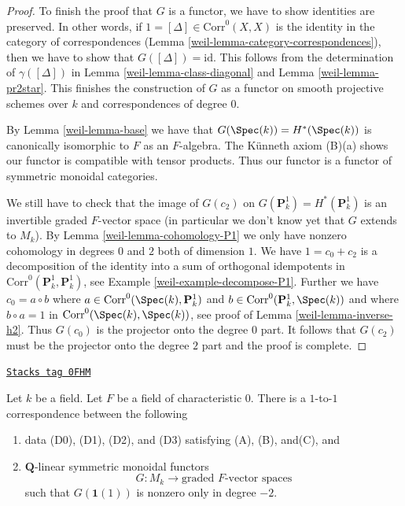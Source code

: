 \begin{proof}
\medskip\noindent
To finish the proof that $G$ is a functor,
we have to show identities are preserved. In other words, if
$1 = [\Delta] \in \text{Corr}^0(X, X)$ is the identity in the category
of correspondences (Lemma \ref{weil-lemma-category-correspondences}),
then we have to show that $G([\Delta]) = \text{id}$.
This follows from the determination
of $\gamma([\Delta])$ in Lemma \ref{weil-lemma-class-diagonal}
and Lemma \ref{weil-lemma-pr2star}.
This finishes the construction of $G$ as a functor on
smooth projective schemes over $k$ and correspondences of degree $0$.

\medskip\noindent
By Lemma \ref{weil-lemma-base} we have that
$G(\Spec(k)) = H^*(\Spec(k))$ is canonically isomorphic to $F$
as an $F$-algebra. The K\"unneth axiom (B)(a)
shows our functor is compatible with tensor products.
Thus our functor is a functor of symmetric monoidal categories.

\medskip\noindent
We still have to check that the image of $G(c_2)$ on
$G(\mathbf{P}^1_k) = H^*(\mathbf{P}^1_k)$
is an invertible graded $F$-vector space (in particular we don't know yet
that $G$ extends to $M_k$). By Lemma \ref{weil-lemma-cohomology-P1}
we only have nonzero cohomology in degrees $0$ and $2$
both of dimension $1$. We have $1 = c_0 + c_2$ is a decomposition
of the identity into a sum of orthogonal idempotents in
$\text{Corr}^0(\mathbf{P}^1_k, \mathbf{P}^1_k)$, see
Example \ref{weil-example-decompose-P1}. Further we have $c_0 = a \circ b$ where
$a \in \text{Corr}^0(\Spec(k), \mathbf{P}^1_k)$ and
$b \in \text{Corr}^0(\mathbf{P}^1_k, \Spec(k))$ and where
$b \circ a = 1$ in $\text{Corr}^0(\Spec(k), \Spec(k))$, see proof of
Lemma \ref{weil-lemma-inverse-h2}. Thus $G(c_0)$ is the projector
onto the degree $0$ part. It follows that $G(c_2)$ must
be the projector onto the degree $2$ part and the proof is complete.
\end{proof}

\begin{proposition}
\label{weil-proposition-weil-cohomology-theory}
\href{https://stacks.math.columbia.edu/tag/0FHM}{\texttt{Stacks tag 0FHM}}

Let $k$ be a field. Let $F$ be a field of characteristic $0$. There is a
$1$-to-$1$ correspondence between the following
\begin{enumerate}
\item data (D0), (D1), (D2), and (D3) satisfying (A), (B), and(C), and
\item $\mathbf{Q}$-linear symmetric monoidal functors
$$
G : M_k \longrightarrow \text{graded }F\text{-vector spaces}
$$
such that $G(\mathbf{1}(1))$ is nonzero only in degree $-2$.
\end{enumerate}
\end{proposition}


